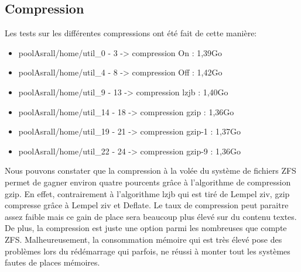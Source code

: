 \documentclass[a4paper]{report}
\begin{document}
\begin{lstlisting}[backgroundcolor=\color{yellow}]
		\end{lstlisting}
		\subsection{Compression}
			Les tests sur les différentes compressions ont été fait de cette manière:
			\begin{itemize}
				\item poolAsrall/home/util\_0 - 3 -> compression On : 1,39Go
				\item poolAsrall/home/util\_4 - 8 -> compression Off : 1,42Go
				\item poolAsrall/home/util\_9 - 13 -> compression lzjb : 1,40Go
				\item poolAsrall/home/util\_14 - 18 -> compression gzip : 1,36Go
				\item poolAsrall/home/util\_19 - 21 -> compression gzip-1 : 1,37Go
				\item poolAsrall/home/util\_22 - 24 -> compression gzip-9 : 1,36Go \\
			\end{itemize}
			Nous pouvons constater que la compression à la volée du système de fichiers ZFS permet de gagner environ quatre pourcents grâce à l'algorithme de compression gzip. En effet, contrairement à l'algorithme lzjb qui est tiré de Lempel ziv, gzip compresse grâce à Lempel ziv et Deflate. Le taux de compression peut paraitre assez faible mais ce gain de place sera beaucoup plus élevé sur du contenu textes. De plus, la compression est juste une option parmi les nombreuses que compte ZFS. Malheureusement, la consommation mémoire qui est très élevé pose des problèmes lors du rédémarrage qui parfois, ne réussi à monter tout les systèmes fautes de places mémoires.
\end{document}
